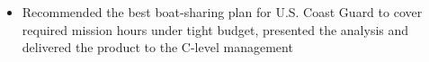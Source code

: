 \documentclass[10.5pt]{res} %
\begin{document}
\begin{resume}
\begin{itemize}
            \item Recommended the best boat-sharing plan for U.S. Coast Guard to cover required mission hours under tight budget, presented the analysis and delivered the product to the C-level management %
        \end{itemize}\vspace{-\topsep}

\end{resume}
\end{document}
